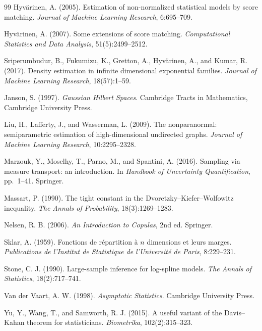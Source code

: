 \begin{thebibliography}{99}
Hyv\"arinen, A. (2005).
Estimation of non-normalized statistical models by score matching.
\emph{Journal of Machine Learning Research}, 6:695--709.

Hyv\"arinen, A. (2007).
Some extensions of score matching.
\emph{Computational Statistics and Data Analysis}, 51(5):2499--2512.

Sriperumbudur, B., Fukumizu, K., Gretton, A., Hyv\"arinen, A., and Kumar, R. (2017).
Density estimation in infinite dimensional exponential families.
\emph{Journal of Machine Learning Research}, 18(57):1--59.

Janson, S. (1997).
\emph{Gaussian Hilbert Spaces}.
Cambridge Tracts in Mathematics, Cambridge University Press.

Liu, H., Lafferty, J., and Wasserman, L. (2009).
The nonparanormal: semiparametric estimation of high-dimensional undirected graphs.
\emph{Journal of Machine Learning Research}, 10:2295--2328.

Marzouk, Y., Moselhy, T., Parno, M., and Spantini, A. (2016).
Sampling via measure transport: an introduction.
In \emph{Handbook of Uncertainty Quantification}, pp.~1--41. Springer.

Massart, P. (1990).
The tight constant in the Dvoretzky--Kiefer--Wolfowitz inequality.
\emph{The Annals of Probability}, 18(3):1269--1283.

Nelsen, R. B. (2006).
\emph{An Introduction to Copulas}, 2nd ed.
Springer.

Sklar, A. (1959).
Fonctions de r\'epartition \`a $n$ dimensions et leurs marges.
\emph{Publications de l'Institut de Statistique de l'Universit\'e de Paris}, 8:229--231.

Stone, C. J. (1990).
Large-sample inference for log-spline models.
\emph{The Annals of Statistics}, 18(2):717--741.

Van der Vaart, A. W. (1998).
\emph{Asymptotic Statistics}.
Cambridge University Press.

Yu, Y., Wang, T., and Samworth, R. J. (2015).
A useful variant of the Davis--Kahan theorem for statisticians.
\emph{Biometrika}, 102(2):315--323.


\end{thebibliography}
